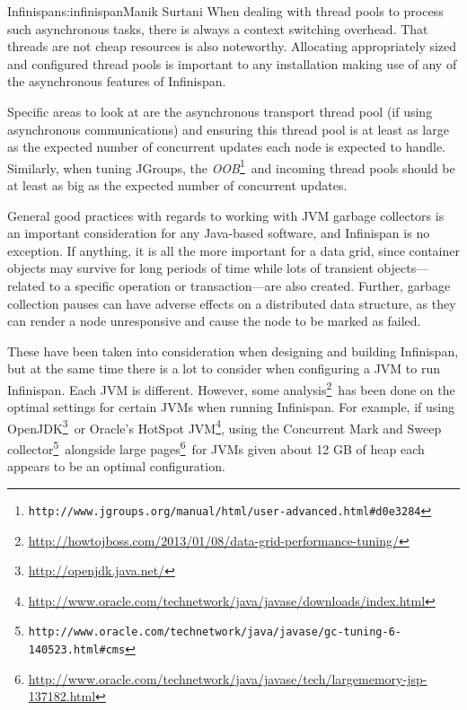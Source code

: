 \begin{aosachapter}{Infinispan}{s:infinispan}{Manik Surtani}
When dealing with thread pools to process such asynchronous tasks, there
is always a context switching overhead. That threads are not cheap
resources is also noteworthy. Allocating appropriately sized and
configured thread pools is important to any installation making use of
any of the asynchronous features of Infinispan.

Specific areas to look at are the asynchronous transport thread pool (if
using asynchronous communications) and ensuring this thread pool is at
least as large as the expected number of concurrent updates each node is
expected to handle. Similarly, when tuning JGroups, the
\emph{OOB}\footnote{\texttt{http://www.jgroups.org/manual/html/user-advanced.html\#d0e3284}}~and
incoming thread pools should be at least as big as the expected number
of concurrent updates.



General good practices with regards to working with JVM garbage
collectors is an important consideration for any Java-based software,
and Infinispan is no exception. If anything, it is all the more
important for a data grid, since container objects may survive for long
periods of time while lots of transient objects---related to a specific
operation or transaction---are also created. Further, garbage
collection pauses can have adverse effects on a distributed data
structure, as they can render a node unresponsive and cause the node to
be marked as failed.

These have been taken into consideration when designing and building
Infinispan, but at the same time there is a lot to consider when
configuring a JVM to run Infinispan. Each JVM is different. However,
some analysis\footnote{\url{http://howtojboss.com/2013/01/08/data-grid-performance-tuning/}}~has
been done on the optimal settings for certain JVMs when running
Infinispan. For example, if using OpenJDK\footnote{\url{http://openjdk.java.net/}}~or
Oracle's HotSpot JVM\footnote{\url{http://www.oracle.com/technetwork/java/javase/downloads/index.html}},
using the Concurrent Mark and Sweep collector\footnote{\texttt{http://www.oracle.com/technetwork/java/javase/gc-tuning-6-140523.html\#cms}}~alongside
large pages\footnote{\url{http://www.oracle.com/technetwork/java/javase/tech/largememory-jsp-137182.html}}~for
JVMs given about 12 GB of heap each appears to be an optimal
configuration.


\end{aosachapter}
